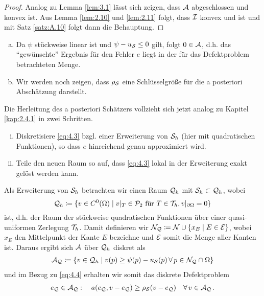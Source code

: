 \begin{proof}
Analog zu Lemma \ref{lem:3.1} lässt sich zeigen, dass $\mathcal A$ abgeschlossen und konvex ist. Aus Lemma \ref{lem:2.10} und \ref{lem:2.11} folgt, dass $\mathcal I$ konvex und  ist und mit Satz \ref{satz:A.10} folgt dann die Behauptung.
\end{proof}


\begin{bem*}
\begin{enumerate}[(a)]
\item Da $\psi$ stückweise linear ist und $\psi-u_{\mathcal S} \le 0$ gilt, folgt $0 \in \mathcal A$, d.h. das "`gewünschte"' Ergebnis für den Fehler $e$ liegt in der für das Defektproblem betrachteten Menge.
\item Wir werden noch zeigen, dass $\rho_{\mathcal S}$ eine Schlüsselgröße für die a posteriori Abschätzung darstellt.
\end{enumerate}
\end{bem*}


Die Herleitung des a posteriori Schätzers vollzieht sich jetzt analog zu Kapitel \ref{kap:2.4.1} in zwei Schritten.
\begin{enumerate}[(i)]
\item	Diskretisiere \eqref{eq:4.3} bzgl. einer Erweiterung von $\mathcal S_h$ (hier mit quadratischen Funktionen), so dass $e$ hinreichend genau approximiert wird.
\item Teile den neuen Raum so auf, dass \eqref{eq:4.3} lokal in der Erweiterung exakt gelöst werden kann.
\end{enumerate}


Als Erweiterung von $\mathcal S_h$ betrachten wir einen Raum $\mathcal Q_h$ mit $\mathcal S_h \subset \mathcal Q_h$, wobei
\[
	\mathcal Q_h \coloneqq \{v \in C^0(\Omega) \mid v|_T \in \mathcal P_2 \text{ für } T\in \mathcal T_h, v|_{\partial\Omega} = 0\}
\]
ist, d.h. der Raum der stückweise quadratischen Funktionen über einer quasi-uniformen Zerlegung $\mathcal T_h$. Damit definieren wir $\mathcal N_{\mathcal Q} \coloneqq \mathcal N \cup \{x_E \mid E \in \mathcal E\}$, wobei $x_E$ den Mittelpunkt der Kante $E$ bezeichne und $\mathcal E$ somit die Menge aller Kanten ist. Daraus ergibt sich $\mathcal A$ über $\mathcal Q_h$ diskret als
\begin{align}\label{eq:4.4}
	\mathcal A_{\mathcal Q} \coloneqq \{v \in \mathcal Q_h \mid v(p) \ge \psi(p)-u_{\mathcal S}(p) \, \forall \, p \in \mathcal N_{\mathcal Q} \cap \Omega\} 
\end{align}
und im Bezug zu \eqref{eq:4.4} erhalten wir somit das diskrete Defektproblem
\begin{align}\label{eq:4.5}
	e_{\mathcal Q} \in \mathcal A_{\mathcal Q} : \quad a(e_{\mathcal Q}, v-e_{\mathcal Q}) \ge \rho_{\mathcal S}(v-e_{\mathcal Q}) \quad \forall \, v \in \mathcal A_{\mathcal Q} \, .
\end{align}


